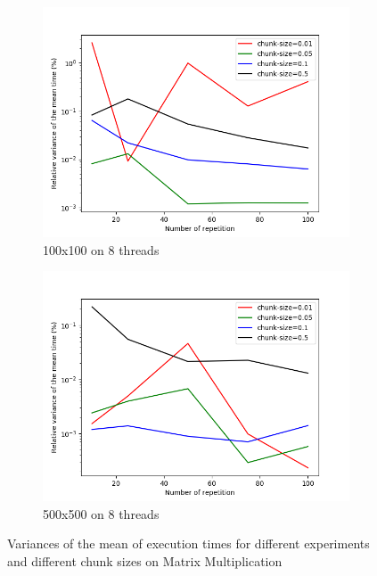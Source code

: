 \documentclass[12pt]{article}
\begin{document}
\begin{figure}
\begin{subfigure}[b]{0.475\textwidth}
		\centering 
		\includegraphics[width=\textwidth]{rel_var_100_8.png}
		\caption[]%
		{{\small 100x100 on 8 threads}}    
	\end{subfigure}
	\quad
	\begin{subfigure}[b]{0.475\textwidth}   
		\centering 
		\includegraphics[width=\textwidth]{rel_var_500_8.png}
		\caption[]%
		{{\small 500x500 on 8 threads}}    
\end{subfigure}
	\caption[Standard deviations]
	{\small Variances of the mean of execution times for different experiments  and different chunk sizes on Matrix Multiplication} 

\end{figure}
\newpage
\end{document}
